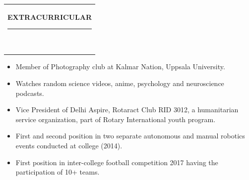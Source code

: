 \documentclass[10pt,A4]{article}
\newcommand{\mpwidth}{\linewidth-\fboxsep-\fboxsep}
\newcommand{\cvtext}[1] {
	\begin{tabular*}{1\mpwidth}{p{0.98\mpwidth}}
		\parbox{1\mpwidth}{#1}
	\end{tabular*}
}
\newcommand{\cvsection}[1] {
	\vspace{14pt}
	\cvtext{
		\textbf{\LARGE{\textcolor{darkcol}{\uppercase{#1}}}}\\[-4pt]
		\textcolor{maincol}{ \rule{0.1\textwidth}{2pt} } \\
	}
}
\newcommand{\cvevent}[7] {
	
	\parbox{\mpwidth}{
		\begin{tabular*}{1\mpwidth}{p{0.72\mpwidth}  r}
	 		\textcolor{black}{\textbf{#2}} & \colorbox{maincol}{\makebox[0.25\mpwidth]{\textcolor{white}{#1}}} \\
			\textcolor{maincol}{\textbf{#3}} & \\
		\end{tabular*}\\[4pt]
	
		\ifthenelse{\isempty{#4}}{}{
			\cvtext{#4}\\
		}
	}

	\ifthenelse{\isempty{#5}}{}{
		\vspace{4pt}
		{#5}
	}
	\vspace{4pt}
}
\begin{document}
\begin{paracol}{2}
\begin{rightcolumn}


\vfill\null
\cvsection{EXTRACURRICULAR}
\vspace{-0.3cm}
\begin{itemize}

  \item Member of Photography club at Kalmar Nation, Uppsala University. 
  \item Watches random science videos, anime, psychology and neuroscience podcasts.
  \item Vice President of Delhi Aspire, Rotaract Club RID 3012, a humanitarian service organization, part of Rotary International youth program.
  \item First and second position in two separate autonomous and manual robotics events conducted at college (2014).
  \item First position in inter-college football competition 2017 having the participation of 10+ teams.

\end{itemize}
\vfill\null


\vfill
\vfill
\vfill
\end{rightcolumn}
\end{paracol}
\end{document}
